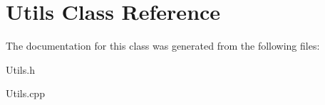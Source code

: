 \hypertarget{class_utils}{}\section{Utils Class Reference}
\label{class_utils}


The documentation for this class was generated from the following files\+:\begin{DoxyCompactItemize}
\item 
Utils.\+h\item 
Utils.\+cpp\end{DoxyCompactItemize}
